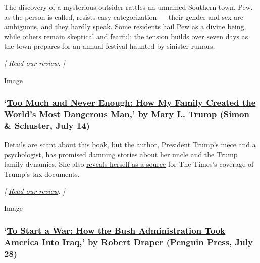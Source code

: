 The discovery of a mysterious outsider rattles an unnamed Southern town.
Pew, as the person is called, resists easy categorization --- their
gender and sex are ambiguous, and they hardly speak. Some residents hail
Pew as a divine being, while others remain skeptical and fearful; the
tension builds over seven days as the town prepares for an annual
festival haunted by sinister rumors.

\emph{{[}}
\href{https://www.nytimes.com/2020/07/13/books/review-pew-catherine-lacey.html}{\emph{Read
our review}}\emph{. {]}}

Image

\hypertarget{too-much-and-never-enough-how-my-family-created-the-worlds-most-dangerous-man-by-mary-l-trump-simon--schuster-july-14}{%
\subsubsection{\texorpdfstring{`\href{https://www.simonandschuster.com/books/Too-Much-and-Never-Enough/Mary-L-Trump/9781982141462}{Too
Much and Never Enough: How My Family Created the World's Most Dangerous
Man},' by Mary L. Trump (Simon \& Schuster, July
14)}{`Too Much and Never Enough: How My Family Created the World's Most Dangerous Man,' by Mary L. Trump (Simon \& Schuster, July 14)}}\label{too-much-and-never-enough-how-my-family-created-the-worlds-most-dangerous-man-by-mary-l-trump-simon--schuster-july-14}}

Details are scant about this book, but the author, President Trump's
niece and a psychologist, has promised damning stories about her uncle
and the Trump family dynamics. She also
\href{https://www.nytimes.com/2020/06/15/books/mary-trump-book.html}{reveals
herself as a source} for The Times's coverage of Trump's tax documents.

\emph{{[}}
\href{https://www.nytimes.com/2020/07/08/books/review-too-much-never-enough-mary-trump.html}{\emph{Read
our review}}\emph{. {]}}

Image

\hypertarget{to-start-a-war-how-the-bush-administration-took-america-into-iraq-by-robert-draper-penguin-press-july-28}{%
\subsubsection{\texorpdfstring{`\href{https://www.penguinrandomhouse.com/books/592622/to-start-a-war-by-robert-draper/}{To
Start a War: How the Bush Administration Took America Into Iraq},' by
Robert Draper (Penguin Press, July
28)}{`To Start a War: How the Bush Administration Took America Into Iraq,' by Robert Draper (Penguin Press, July 28)}}\label{to-start-a-war-how-the-bush-administration-took-america-into-iraq-by-robert-draper-penguin-press-july-28}}

